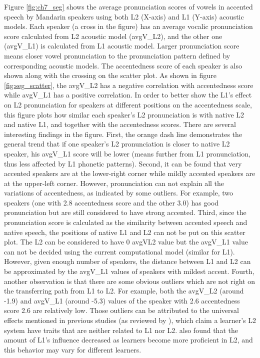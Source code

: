 Figure \ref{fig:ch7_seg} shows the average pronunciation scores of vowels in accented speech by Mandarin speakers using both L2 (X-axis) and L1 (Y-axis) acoustic models. Each speaker (a cross in the figure) has an average vocalic pronunciation score calculated from L2 acoustic model (avgV\_L2), and the other one (avgV\_L1) is calculated from L1 acoustic model. Larger pronunciation score means closer vowel pronunciation to the pronunciation pattern defined by corresponding acoustic models. The accentedness score of each speaker is also shown along with the crossing on the scatter plot. As shown in figure \ref{fig:seg_scatter}, the avgV\_L2 has a negative correlation with accentedness score while avgV\_L1 has a positive correlation. In order to better show the L1's effect on L2 pronunciation for speakers at different positions on the accentedness scale, this figure plots how similar each speaker's L2 pronunciation is with native L2 and native L1, and together with the accentedness scores. There are several interesting findings in the figure. First, the orange dash line demonstrates the general trend that if one speaker's L2 pronunciation is closer to native L2 speaker, his avgV\_L1 score will be lower (means further from L1 pronunciation, thus less affected by L1 phonetic patterns). Second, it can be found that very accented speakers are at the lower-right corner while mildly accented speakers are at the upper-left corner. However, pronunciation can not explain all the variations of accentedness, as indicated by some outliers. For example, two speakers (one with 2.8 accentedness score and the other 3.0) has good pronunciation but are still considered to have strong accented. Third, since the pronunciation score is calculated as the similarity between accented speech and native speech, the positions of native L1 and L2 can not be put on this scatter plot. The L2 can be considered to have 0 avgV\-L2 value but the avgV\_L1 value can not be decided using the current computational model (similar for L1). However, given enough number of speakers, the distance between L1 and L2 can be approximated by the avgV\_L1 values of speakers with mildest accent. Fourth, another observation is that there are some obvious outliers which are not right on the transferring path from L1 to L2. For example, both the avgV\_L2 (around -1.9) and avgV\_L1 (around -5.3) values of the speaker with 2.6 accentedness score 2.6 are relatively low. Those outliers can be attributed to the universal effects mentioned in previous studies (as reviewed by \cite{white1989universal}), which claim a learner's L2 system have traits that are neither related to L1 nor L2. \cite{major1987model} also found that the amount of L1's influence decreased as learners become more proficient in L2, and this behavior may vary for different learners.

